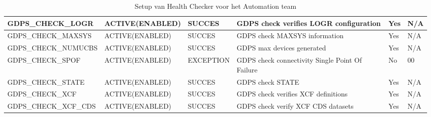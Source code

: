 \begin{landscape}
\begin{table}[h]
\begin{tabular}{|l|l|l|p{4.5cm}|l|l|}
			GDPS\_CHECK\_LOGR         & ACTIVE(ENABLED)  & SUCCES           & GDPS   check verifies LOGR configuration        & Yes          & N/A                \\ \hline
			GDPS\_CHECK\_MAXSYS       & ACTIVE(ENABLED)  & SUCCES           & GDPS   check MAXSYS information                 & Yes          & N/A                \\ \hline
			GDPS\_CHECK\_NUMUCBS      & ACTIVE(ENABLED)  & SUCCES           & GDPS   max devices generated                    & Yes          & N/A                \\ \hline
			GDPS\_CHECK\_SPOF         & ACTIVE(ENABLED)  & EXCEPTION        & GDPS check connectivity Single Point Of Failure & No           & 00                 \\ \hline
			GDPS\_CHECK\_STATE        & ACTIVE(ENABLED)  & SUCCES           & GDPS   check STATE                              & Yes          & N/A                \\ \hline
			GDPS\_CHECK\_XCF          & ACTIVE(ENABLED)  & SUCCES           & GDPS   check verifies XCF definitions           & Yes          & N/A                \\ \hline
			GDPS\_CHECK\_XCF\_CDS     & ACTIVE(ENABLED)  & SUCCES           & GDPS   check verify XCF CDS datasets            & Yes          & N/A                \\ \hline
		\end{tabular}
		\caption[Health Checker Setup Automation team]{Setup van Health Checker voor het Automation team}
		\label{tbl:Automation Team Tabel}
	\end{table}
\end{landscape}


